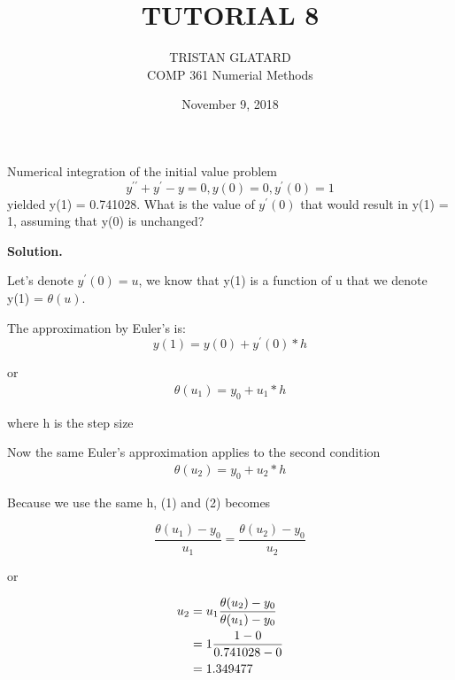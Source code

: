  

 

\title{TUTORIAL 8}%
\author{TRISTAN GLATARD\\ %
COMP 361 Numerial Methods} %
\date{November 9, 2018} 
\maketitle

\begin{exercise}{1} %
Numerical integration of the initial value problem
$$y^{\prime\prime} + y^\prime-y = 0, y(0) = 0, y^\prime(0) = 1$$
yielded y(1) = 0.741028. What is the value of $y^\prime(0)$ that would result in y(1) = 1, assuming that y(0) is unchanged?

\textbf{Solution.} 

Let's denote $y^\prime(0) = u$, we know that y(1) is a function of u that we denote y(1) = $\theta(u)$.

The approximation by Euler's is:
$$y(1) = y(0) + y^\prime(0)*h$$

or
\begin{align}
 \theta(u_1) = y_0 + u_1*h   
\end{align}

where h is the step size

Now the same Euler's approximation applies to the second condition
\begin{align}
 \theta(u_2) = y_0 + u_2*h   
\end{align}

Because we use the same h, (1) and (2) becomes

$$\frac{\theta(u_1)-y_0}{u_1} = \frac{\theta(u_2)-y_0}{u_2}$$

or

\begin{align}
u_2 &= u_1 \frac{\theta(u_2)-y_0}{\theta(u_1)-y_0} \notag \\   
&=1\frac{1-0}{0.741028-0} \notag \\
&=1.349477 \notag
\end{align}

\end{exercise}

